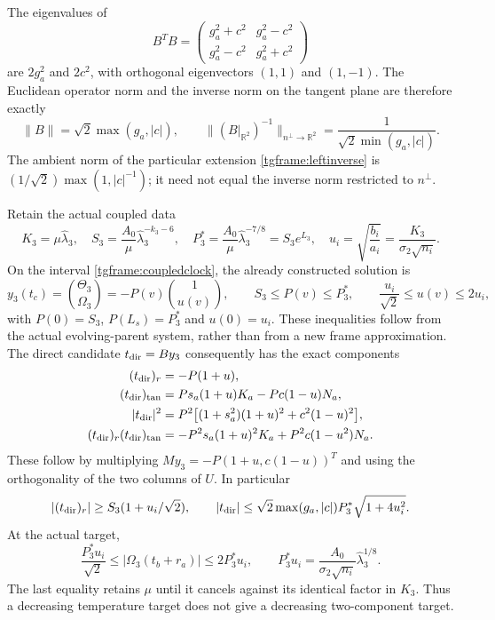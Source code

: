 The eigenvalues of
\[
 B^TB=
 \begin{pmatrix}g_a^2+c^2&g_a^2-c^2\\
                 g_a^2-c^2&g_a^2+c^2\end{pmatrix}
\]
are $2g_a^2$ and $2c^2$, with orthogonal eigenvectors $(1,1)$
and $(1,-1)$. The Euclidean operator norm and the inverse norm on
the tangent plane are therefore exactly
\begin{equation}\label{tgframe:framenorms}
 \|B\|=\sqrt2\max(g_a,|c|),\qquad
 \|(B|_{\mathbb R^2})^{-1}\|_{n^\perp\to\mathbb R^2}
       =\frac1{\sqrt2\min(g_a,|c|)}.
\end{equation}
The ambient norm of the particular extension \eqref{tgframe:leftinverse}
is $(1/\sqrt2)\max(1,|c|^{-1})$; it need not equal the inverse norm
restricted to $n^\perp$.

Retain the actual coupled data
\[
 K_3=\mu\widehat\lambda_3,\quad
 S_3=\frac{A_0}{\mu}\widehat\lambda_3^{-k_3-6},\quad
 P_3^*=\frac{A_0}{\mu}\widehat\lambda_3^{-7/8}=S_3e^{L_3},
 \quad u_i=\sqrt{\frac{b_i}{a_i}}
           =\frac{K_3}{\sigma_2\sqrt{n_i}}.
\]
On the interval \eqref{tgframe:coupledclock}, the already constructed
solution is
\[
 y_3(t_c)=\binom{\Theta_3}{\Omega_3}
        =-P(v)\binom{1}{u(v)},\qquad
 S_3\le P(v)\le P_3^*,\qquad
 \frac{u_i}{\sqrt2}\le u(v)\le2u_i,
\]
with $P(0)=S_3$, $P(L_s)=P_3^*$ and $u(0)=u_i$.
These inequalities follow from the actual evolving-parent system,
rather than from a new frame approximation.
The direct candidate $t_{\rm dir}=By_3$ consequently has the exact
components
\begin{align}
 (t_{\rm dir})_r&=-P(1+u),\nonumber\\
 (t_{\rm dir})_{\tan}
       &=P s_a(1+u)K_a-Pc(1-u)N_a,\label{tgframe:directcomponents}\\
 |t_{\rm dir}|^2
       &=P^2\bigl[(1+s_a^2)(1+u)^2+c^2(1-u)^2\bigr],\nonumber\\
 (t_{\rm dir})_r(t_{\rm dir})_{\tan}
       &=-P^2s_a(1+u)^2K_a+P^2c(1-u^2)N_a.\nonumber
\end{align}
These follow by multiplying $My_3=-P(1+u,c(1-u))^T$ and using
the orthogonality of the two columns of $U$. In particular
\[
 |(t_{\rm dir})_r|\ge S_3(1+u_i/\sqrt2),\qquad
 |t_{\rm dir}|\le\sqrt2\max(g_a,|c|)P_3^*\sqrt{1+4u_i^2}.
\]
At the actual target,
\begin{equation}\label{tgframe:endpointomega}
 \frac{P_3^*u_i}{\sqrt2}\le|\Omega_3(t_b+r_a)|
                      \le2P_3^*u_i,\qquad
 P_3^*u_i=\frac{A_0}{\sigma_2\sqrt{n_i}}
                          \widehat\lambda_3^{1/8}.
\end{equation}
The last equality retains $\mu$ until it cancels against its identical
factor in $K_3$. Thus a decreasing temperature target does not give a
decreasing two-component target.

